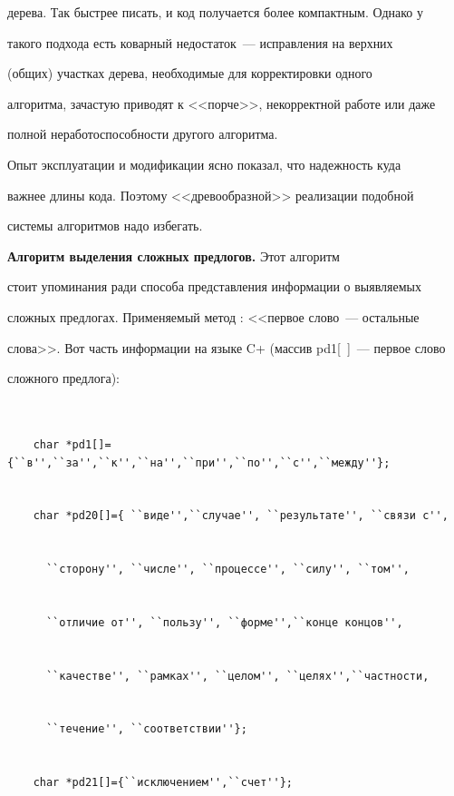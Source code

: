 дерева. Так быстрее писать, и код получается более компактным. Однако у 


такого подхода есть коварный недостаток~---  исправления на верхних 


(общих) участках дерева, необходимые для корректировки одного 


алгоритма, зачастую приводят к <<порче>>, некорректной работе  или даже 


полной неработоспособности другого алгоритма. 


   


   Опыт эксплуатации и модификации ясно показал, что надежность куда 


важнее длины кода. Поэтому <<древообразной>> реализации подобной 


системы алгоритмов надо избегать.


   


   \smallskip


   \textbf{Алгоритм выделения сложных предлогов.} Этот алгоритм 


стоит упоминания ради способа представления информации о выявляемых 


сложных предлогах. Применяемый метод : <<первое слово~--- остальные 


слова>>. Вот часть информации на языке C+ (массив pd1[\ ]~--- первое слово 


сложного предлога):


  {\footnotesize\begin{verbatim}


    char *pd1[]={``в'',``за'',``к'',``на'',``при'',``по'',``с'',``между''};


    char *pd20[]={ ``виде'',``случае'', ``результате'', ``связи с'',


      ``сторону'', ``числе'', ``процессе'', ``силу'', ``том'', 


      ``отличие от'', ``пользу'', ``форме'',``конце концов'', 


      ``качестве'', ``рамках'', ``целом'', ``целях'',``частности,


      ``течение'', ``соответствии''};


    char *pd21[]={``исключением'',``счет''};


   \end{verbatim}


   }


   


